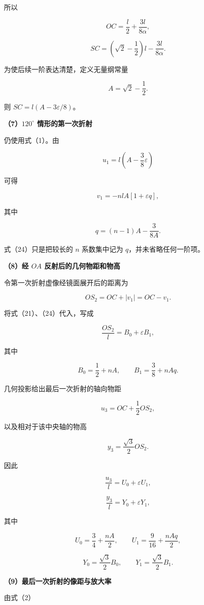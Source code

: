 \documentclass[12pt,a4paper,UTF8]{ctexart}
\begin{document}
所以

\[
\boxed{
OC=\frac l2+\frac{3l}{8\alpha}
},
\tag{21}
\]

\[
\boxed{
SC
=\left(\sqrt2-\frac12\right)l
-\frac{3l}{8\alpha}
}.
\tag{22}
\]

为使后续一阶表达清楚，定义无量纲常量

\[
A=\sqrt2-\frac12.
\tag{23}
\]

则 \(SC=l(A-3\varepsilon/8)\)。

\textbf{（7）\(120^\circ\) 情形的第一次折射}

仍使用式（1）。由

\[
u_1=l\left(A-\frac38\varepsilon\right)
\]

可得

\[
\boxed{
v_1
=-nlA
\left[
1+\varepsilon q
\right]
},
\tag{24}
\]

其中

\[
\boxed{
q=(n-1)A-\frac{3}{8A}
}.
\tag{25}
\]

式（24）只是把较长的 \(n\) 系数集中记为 \(q\)，并未省略任何一阶项。

\textbf{（8）经 \(OA\) 反射后的几何物距和物高}

令第一次折射虚像经镜面展开后的距离为

\[
OS_2=OC+|v_1|=OC-v_1.
\tag{26}
\]

将式（21）、（24）代入，写成

\[
\frac{OS_2}{l}=B_0+\varepsilon B_1,
\tag{27}
\]

其中

\[
B_0=\frac12+nA,
\qquad
B_1=\frac38+nAq.
\tag{28}
\]

几何投影给出最后一次折射的轴向物距

\[
u_3=OC+\frac12OS_2,
\tag{29}
\]

以及相对于该中央轴的物高

\[
y_3=\frac{\sqrt3}{2}OS_2.
\tag{30}
\]

因此

\[
\frac{u_3}{l}=U_0+\varepsilon U_1,
\tag{31}
\]

\[
\frac{y_3}{l}=Y_0+\varepsilon Y_1,
\tag{32}
\]

其中

\[
U_0=\frac34+\frac{nA}{2},
\qquad
U_1=\frac9{16}+\frac{nAq}{2},
\tag{33}
\]

\[
Y_0=\frac{\sqrt3}{2}B_0,
\qquad
Y_1=\frac{\sqrt3}{2}B_1.
\tag{34}
\]

\textbf{（9）最后一次折射的像距与放大率}

由式（2）
\end{document}
